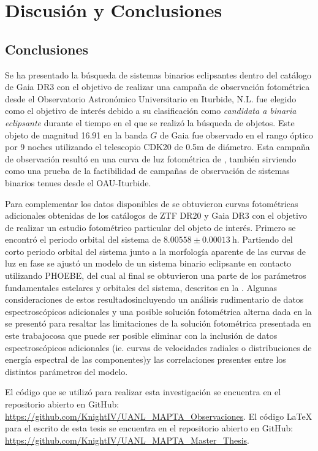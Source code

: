 \part{Discusión y Conclusiones}



\chapter{Conclusiones}

Se ha presentado la búsqueda de sistemas binarios eclipsantes dentro del
catálogo de Gaia DR3 con el objetivo de realizar una campaña de observación
fotométrica desde el Observatorio Astronómico Universitario en Iturbide, N.L.
\atoObjId fue elegido como el objetivo de interés debido a su clasificación como
\textit{candidata a binaria eclipsante} durante el tiempo en el que se realizó
la búsqueda de objetos. Este objeto de magnitud 16.91 en la banda $G$ de Gaia
fue observado en el rango óptico por 9 noches utilizando el telescopio CDK20 de
0.5m de diámetro. Esta campaña de observación resultó en una curva de luz
fotométrica de \atoObjIdNoSpace, también sirviendo como una prueba de la
factibilidad de campañas de observación de sistemas binarios tenues desde el
OAU-Iturbide.

Para complementar los datos disponibles de \atoObjId se obtuvieron curvas
fotométricas adicionales obtenidas de los catálogos de ZTF DR20 y Gaia DR3 con
el objetivo de realizar un estudio fotométrico particular del objeto de interés.
Primero se encontró el periodo orbital del sistema de $8.00558 \pm 0.00013 \
\mathrm{h}$. Partiendo del corto periodo orbital del sistema junto a la
morfología aparente de las curvas de luz en fase se ajustó un modelo de un
sistema binario eclipsante en contacto utilizando PHOEBE, del cual al final se
obtuvieron una parte de los parámetros fundamentales estelares y orbitales del
sistema, descritos en la
. Algunas
consideraciones de estos resultados\textemdash incluyendo un análisis
rudimentario de datos espectroscópicos adicionales y una posible solución
fotométrica alterna dada en la
\textemdash
se presentó para resaltar las limitaciones de la solución fotométrica presentada
en este trabajo\textemdash cosa que puede ser posible eliminar con la inclusión
de datos espectroscópicos adicionales (ie. curvas de velocidades radiales o
distribuciones de energía espectral de las componentes)\textemdash y las
correlaciones presentes entre los distintos parámetros del modelo.

El código que se utilizó para realizar esta investigación se encuentra en el
repositorio abierto en GitHub:
\url{https://github.com/KnightIV/UANL_MAPTA_Observaciones}. El código LaTeX para
el escrito de esta tesis se encuentra en el repositorio abierto en GitHub:
\url{https://github.com/KnightIV/UANL_MAPTA_Master_Thesis}.